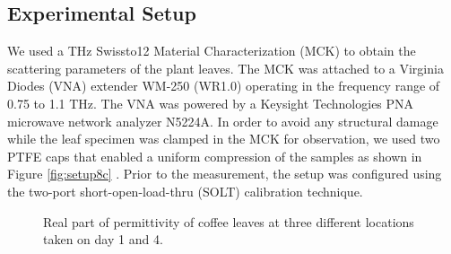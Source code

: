 \documentclass[journal,article,submit,moreauthors,pdftex]{Definitions/mdpi}
\renewcommand{\^}{\hat}  %
\begin{document}
\subsection{Experimental Setup}
%
We used a THz Swissto12 Material Characterization (MCK) to obtain the scattering parameters of the plant leaves. The MCK was attached to a Virginia Diodes (VNA) extender WM-250 (WR1.0) operating in the frequency range of  0.75 to 1.1 THz. The VNA was powered by a Keysight Technologies PNA microwave network analyzer N5224A. In order to avoid any structural damage while the leaf specimen was clamped in the MCK for observation, we used two PTFE caps that enabled a uniform compression of the samples as shown in Figure \ref{fig:setup8c} . Prior to the measurement, the setup was configured using the two-port short-open-load-thru (SOLT) calibration technique.

\begin{figure}[t!]
	\centering
	\hfill
	\caption{Real part of permittivity of coffee leaves at three different locations taken on  day 1 and 4.}
	\label{fig:coffee_days}
\end{figure}
\end{document}
